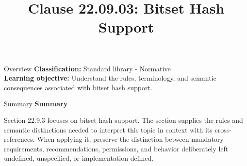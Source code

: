 \documentclass[10pt,letterpaper]{article}
\title{Clause 22.09.03: Bitset Hash Support}
\author{}
\date{}
\begin{document}
\maketitle
\begin{CornellOverviewBox}{Overview}
\textbf{Classification:} Standard library - Normative\\[2pt]
\textbf{Learning objective:} Understand the rules, terminology, and semantic consequences associated with bitset hash support.
\end{CornellOverviewBox}\begin{CornellSummaryBox}{Summary}
{\sffamily\bfseries\color{Accent} Summary}\par\vspace{3pt}Section 22.9.3 focuses on bitset hash support. The section supplies the rules and semantic distinctions needed to interpret this topic in context with its cross-references. When applying it, preserve the distinction between mandatory requirements, recommendations, permissions, and behavior deliberately left undefined, unspecified, or implementation-defined.
\end{CornellSummaryBox}
\end{document}
